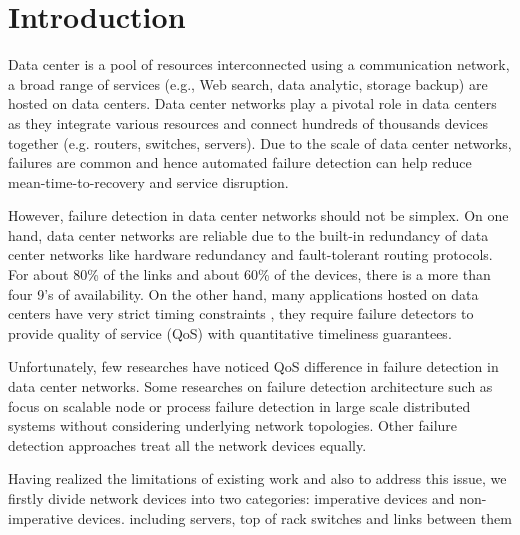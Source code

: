 \documentclass{sig-alternate-05-2015}
\begin{document}
%
%

%
%
\printccsdesc



\section{Introduction}
Data center is a pool of resources interconnected using a communication network, a broad range of services (e.g., Web search, data analytic, storage backup) are hosted on data centers. Data center networks play a pivotal role in data centers as they integrate various resources and connect hundreds of thousands devices together (e.g. routers, switches, servers). Due to the scale of data center networks, failures are common and hence automated failure detection can help reduce mean-time-to-recovery and service disruption.

However, failure detection in data center networks should not be simplex. On one hand, data center networks are reliable \cite{gill2011understanding} due to the built-in redundancy of data center networks like hardware redundancy and fault-tolerant routing protocols. For about 80\% of the links and about 60\% of the devices, there is a more than four 9's of availability. On the other hand, many applications hosted on data centers have very strict timing constraints \cite{tomsic20152w}, they require failure detectors to provide quality of service (QoS) with quantitative timeliness guarantees.

Unfortunately, few researches have noticed QoS difference in failure detection in data center networks. Some researches on failure detection architecture such as \cite{felber1999failure} \cite{van1998gossip} \cite{gillen2007scalable} \cite{xu2012smart} \cite{xu2012smart} focus on scalable node or process failure detection in large scale distributed systems without considering underlying network topologies. Other failure detection approaches \cite{bahl2007towards} \cite{herodotou2014scalable} \cite{kandula2005shrink} treat all the network devices equally.

Having realized the limitations of existing work and also to address this issue, we firstly divide network devices into two categories: imperative devices and non-imperative devices. including servers, top of rack switches and links between them
\end{document}
